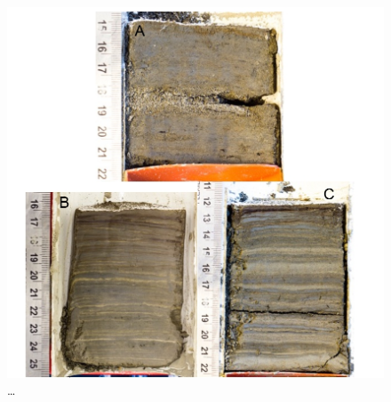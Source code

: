 \documentclass[
  letterpaper,
  DIV=11,
  numbers=noendperiod]{scrartcl}
\begin{document}
\begin{figure}

{\centering \includegraphics[width=1\textwidth,height=\textheight]{figs/ekman_example.jpg}

}

\caption{\label{fig-ekmanImgs}\ldots{}}

\end{figure}
\end{document}
